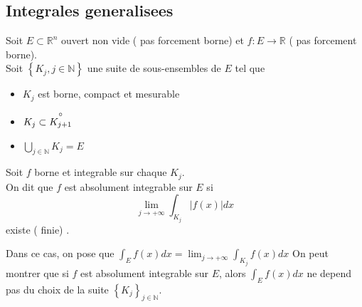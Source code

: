 \documentclass[../main.tex]{subfiles}
\begin{document}
\subsection{Integrales generalisees}
\begin{defn}
	Soit $E \subset \mathbb{R}^n$ ouvert non vide ( pas forcement borne) et $f: E \to \mathbb{R}$ (  pas forcement borne).\\
	Soit $ \left\{ K_j, j \in \mathbb{N} \right\} $ une suite de sous-ensembles de $E$ tel que
	\begin{itemize}
	\item $K_j$ est borne, compact et mesurable
	\item $K_j \subset \overset{\circ}{ K_{j+1} } $ 
	\item $ \bigcup_{j \in \mathbb{N}} K_j= E$
	\end{itemize}
	Soit $f$ borne et integrable sur chaque $K_j$.\\
	On dit que $f$ est absolument integrable sur $E$ si 
	\[ 
		\lim_{j \to  + \infty} \int_{ K_{j}  }^{  }|f( x) | dx 
	\]
	existe ( finie) .
\end{defn}
Dans ce cas, on pose que $ \int_{ E }^{  }f( x) dx = \lim_{j \to  + \infty} \int_{ K_j  }^{  }f( x) dx$ 
On peut montrer que si $f$ est absolument integrable sur $E$, alors $\int_{ E }^{  }f( x) dx$ ne depend pas du choix de la suite $ \left\{ K_j \right\}_{j \in \mathbb{N}}  $.
	
\end{document}

